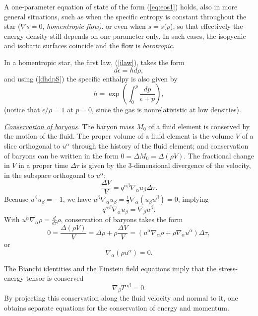 \documentclass[12pt]{article}
\def\be{\begin{equation}}
\def\ee{\end{equation}}
\newcommand{\dis}{\displaystyle}
\begin{document}
A one-parameter equation 
of state of the form (\ref{eq:eos1}) holds, also in more
general situations, such as when the specific entropy is constant throughout
the star ($\nabla s = 0$,  {\it homentropic flow)}. 
or even when $s=s(\rho$), so that effectively the energy density still depends on one parameter only. In such cases, the isopycnic and
isobaric surfaces coincide and the flow is {\it barotropic}.


In a homentropic star, the first law, (\ref{ilaw}), takes the form
\be
   d\epsilon = h d\rho, 
\label{dedrho}\ee
and using (\ref{dhdpS}) the specific enthalpy is also given by
\be
    h = \exp\left(\int_0^p \frac{dp}{\epsilon+p}\right),
\label{enth2}\ee 
(notice that  $\dis \epsilon/\rho = 1$ at $p = 0$, since the gas is nonrelativistic at low densities).  


\vskip0.8cm

\noindent
{\it \uline{Conservation of baryons}.}
The baryon mass $ M_0$ of a fluid element is conserved by the motion
of the fluid. The proper volume of a fluid element is the volume $ V$
of a slice orthogonal to $u^\alpha$ through the history of the fluid
element; and conservation of baryons can be written in the form
$ 0 = \Delta M_0 = \Delta (\rho V)$.
The fractional change in $ V$ in a proper time $ \Delta \tau$ is
given by the 3-dimensional divergence of the velocity, in the subspace
orthogonal to $ u^\alpha$:
\be
  \frac{\Delta V}V = q^{\alpha\beta}\nabla_\alpha u_\beta \Delta \tau.
\label{eq:divu1}\ee
Because $ u^\beta u_\beta = -1$, we have
$ u^\beta \nabla_\alpha u_\beta = \frac12 \nabla_\alpha( u_\beta
u^\beta)
 = 0$, implying
\be
q^{\alpha\beta}\nabla_\alpha u_\beta = \nabla_\beta u^\beta.
\label{eq:divu2}\ee
With $\displaystyle u^\alpha \nabla_\alpha \rho = \frac d{d\tau}\rho$,
conservation of baryons takes the form
\be 0 = \frac{\Delta(\rho V)}V
= \Delta\rho+\rho\frac{\Delta V}V
= (u^\alpha\nabla_\alpha\rho + \rho \nabla_\alpha u^\alpha)\Delta
\tau,
\label{drhodv}\ee
or
\be
       \boxed{ \nabla_\alpha (\rho u^\alpha) = 0}.
\label{eq:baryon}\ee

\vskip 0.8cm
 The Bianchi identities and the Einstein field equations  imply that the
stress-energy
tensor is conserved
\be \nabla_\beta T^{\alpha\beta} = 0. \label{divT}\ee
By projecting this conservation along the fluid velocity and normal to it, one obtains separate equations for the conservation of energy and momentum. 
\end{document}
